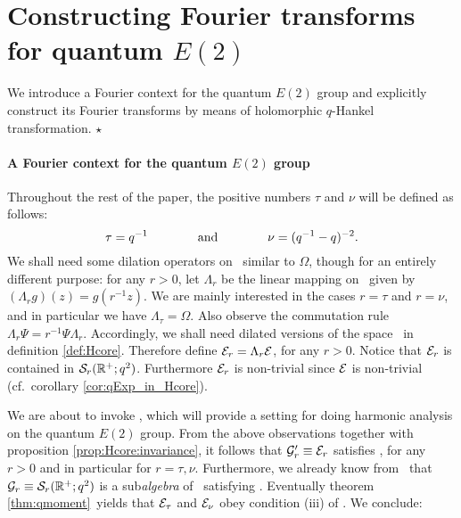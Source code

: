 \section{Constructing Fourier transforms for quantum $E(2)$}

\begin{abs} \rm
We introduce a Fourier context for the quantum $E(2)$ group
and explicitly construct its Fourier transforms by means of
holomorphic $q$-Hankel transformation.
\hfill $\star$
\end{abs}

\paragraph{A Fourier context for the quantum $E(2)$ group}
Throughout the rest of the paper, the positive numbers $\tau$ and
$\nu$ will be defined as follows:
\begin{equation}\label{eq:tau_nu:value}
   \tau = q^{-1}  \andspace{4em}  \nu = (q^{-1}-q)^{-2}.
\end{equation}
We shall need some dilation operators on \HC\ similar to $\Omega$,
though for an entirely different purpose: for any $r>0$, let
$\Lambda_r$ be the linear mapping on \HC\ given by
$(\Lambda_r g)(z) = g(r^{-1} z)$.
We are mainly interested in the cases $r=\tau$ and $r=\nu$, and
in particular we have $\Lambda_\tau = \Omega$.
Also observe the commutation rule $\Lambda_r \Psi = r^{-1} \Psi \Lambda_r$.
Accordingly, we shall need dilated versions of the space \Hcore\ in
definition \ref{def:Hcore}\@. Therefore define $\Hcore_r = \Lambda_r \Hcore$,
for any $r>0$. Notice that $\Hcore_r$ is contained in ${\mathcal S}_r(\RR^+;q^2)$.
Furthermore $\Hcore_r$ is non-trivial since $\Hcore$ is non-trivial
(cf.\ corollary \ref{cor:qExp_in_Hcore}).

We are about to invoke \cite[theorem 3.6.1]{Jeroen:QE2:haar}, which will
provide a setting for doing harmonic analysis on the quantum $E(2)$ group.
From the above observations together with proposition \ref{prop:Hcore:invariance},
it follows that ${\mathcal G}_r' \equiv \Hcore_r$ satisfies
\mbox{\cite[assumptions 3.4.1.1]{Jeroen:QE2:haar}}, for any $r>0$ and
in particular for $r=\tau,\nu$.
Furthermore, we already know from \mbox{\cite[example 3.4.1.2]{Jeroen:QE2:haar}}\ that
${\mathcal G}_r \equiv {\mathcal S}_r(\RR^+;q^2)$ is a sub{\em algebra\/} of \HC\
satisfying \mbox{\cite[assumptions 3.4.1.1]{Jeroen:QE2:haar}}\@.
Eventually theorem \ref{thm:qmoment}\ yields that $\Hcore_\tau$ and $\Hcore_\nu$
obey condition (iii) of \mbox{\cite[theorem 3.6.1]{Jeroen:QE2:haar}}\@. We conclude:

